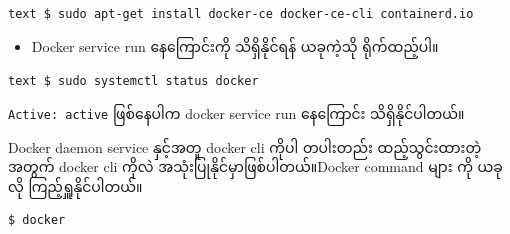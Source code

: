\documentclass{article}
\begin{document}
\texttt{text   \$ sudo apt-get install docker-ce docker-ce-cli containerd.io}

\begin{itemize}
\itemsep1pt\parskip0pt
\item
  Docker service run နေကြောင်းကို သိရှိနိုင်ရန် ယခုကဲ့သို ရိုက်ထည့်ပါ။
\end{itemize}

\texttt{text   \$ sudo systemctl status docker}

\texttt{Active: active} ဖြစ်နေပါက docker service run နေကြောင်း
သိရှိနိုင်ပါတယ်။

Docker daemon service နှင့်အတူ docker cli ကိုပါ တပါးတည်း ထည့်သွင်းထားတဲ့
အတွက် docker cli ကိုလဲ အသုံးပြုနိုင်မှာဖြစ်ပါတယ်။Docker command များ ကို
ယခုလို ကြည့်ရှူနိုင်ပါတယ်။

\begin{verbatim}
$ docker
\end{verbatim}
\end{document}

